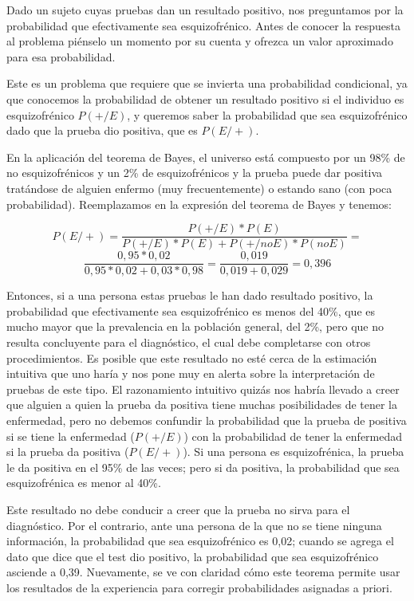 \documentclass[]{article}
\begin{document}
Dado un sujeto cuyas pruebas dan un resultado positivo, nos preguntamos
por la probabilidad que efectivamente sea esquizofrénico. Antes de
conocer la respuesta al problema piénselo un momento por su cuenta y
ofrezca un valor aproximado para esa probabilidad.

Este es un problema que requiere que se invierta una probabilidad
condicional, ya que conocemos la probabilidad de obtener un resultado
positivo si el individuo es esquizofrénico \(P(+/E)\), y queremos saber
la probabilidad que sea esquizofrénico dado que la prueba dio positiva,
que es \(P(E/+)\).

En la aplicación del teorema de Bayes, el universo está compuesto por un
98\% de no esquizofrénicos y un 2\% de esquizofrénicos y la prueba puede
dar positiva tratándose de alguien enfermo (muy frecuentemente) o
estando sano (con poca probabilidad). Reemplazamos en la expresión del
teorema de Bayes y tenemos:

\[P(E/+) = \frac{P(+/E)*P(E)}{P(+/E)*P(E) + P(+/noE)*P(noE)} =\]
\[\frac{0,95*0,02}{0,95*0,02 + 0,03*0,98} = \frac{0,019}{0,019 + 0,029} = 0,396\]

Entonces, si a una persona estas pruebas le han dado resultado positivo,
la probabilidad que efectivamente sea esquizofrénico es menos del 40\%,
que es mucho mayor que la prevalencia en la población general, del 2\%,
pero que no resulta concluyente para el diagnóstico, el cual debe
completarse con otros procedimientos. Es posible que este resultado no
esté cerca de la estimación intuitiva que uno haría y nos pone muy en
alerta sobre la interpretación de pruebas de este tipo. El razonamiento
intuitivo quizás nos habría llevado a creer que alguien a quien la
prueba da positiva tiene muchas posibilidades de tener la enfermedad,
pero no debemos confundir la probabilidad que la prueba de positiva si
se tiene la enfermedad (\(P(+/E)\)) con la probabilidad de tener la
enfermedad si la prueba da positiva (\(P(E/+)\)). Si una persona es
esquizofrénica, la prueba le da positiva en el 95\% de las veces; pero
si da positiva, la probabilidad que sea esquizofrénica es menor al 40\%.

Este resultado no debe conducir a creer que la prueba no sirva para el
diagnóstico. Por el contrario, ante una persona de la que no se tiene
ninguna información, la probabilidad que sea esquizofrénico es 0,02;
cuando se agrega el dato que dice que el test dio positivo, la
probabilidad que sea esquizofrénico asciende a 0,39. Nuevamente, se ve
con claridad cómo este teorema permite usar los resultados de la
experiencia para corregir probabilidades asignadas a priori.
\end{document}
